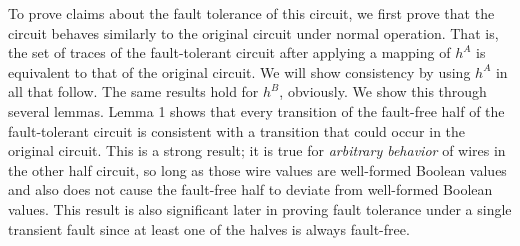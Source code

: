 \documentclass[12pt]{report}
\begin{document}
To prove claims about the fault tolerance of this circuit, we first prove that the circuit behaves similarly to the original circuit under normal operation.  That is, the set of traces of the fault-tolerant circuit after applying a mapping of $h^A$ is equivalent to that of the original circuit.  We will show consistency by using $h^A$ in all that follow.  The same results hold for $h^B$, obviously.  We show this through several lemmas. Lemma 1 shows that every transition of the fault-free half of the fault-tolerant circuit is consistent with a transition that could occur in the original circuit.  
This is a strong result; it is true for  {\em arbitrary behavior} of
wires in the other half circuit, so long as those wire values are well-formed Boolean values and also does not cause the fault-free half to deviate from well-formed Boolean values.  
This result is also significant later in proving fault tolerance under a single transient fault since at least one of the halves is always fault-free.  %
\\
\end{document}
